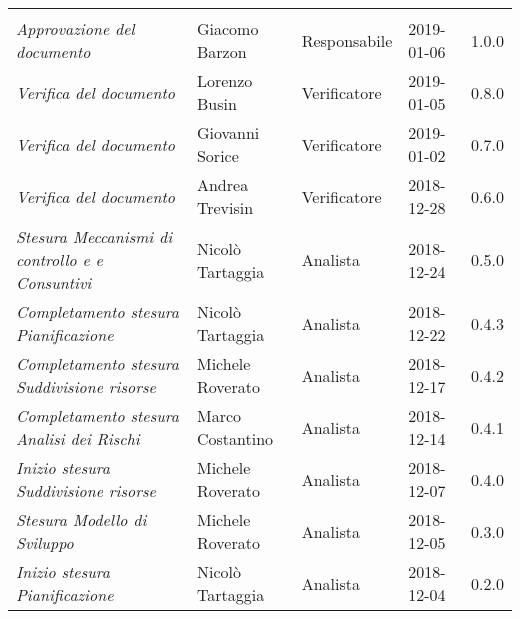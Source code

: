 \newpage 
\section*{}
\begin{table}[H]
	\centering
	\begin{tabular}{p{4cm}|C{3cm}|C{3cm}|R{2.5cm}|R{2cm}}
		
		 & & & & \\
		
		
		\emph{Approvazione del documento} & Giacomo Barzon & Responsabile & 2019-01-06 & 1.0.0 \\
		\hline
		
		\emph{Verifica del documento} & Lorenzo Busin & Verificatore & 2019-01-05 & 0.8.0 \\
		\hline
		
		\emph{Verifica del documento} & Giovanni Sorice & Verificatore & 2019-01-02 & 0.7.0 \\
		\hline
		
		\emph{Verifica del documento} & Andrea Trevisin & Verificatore & 2018-12-28 & 0.6.0 \\
		\hline
		
		\emph{Stesura Meccanismi di controllo e e Consuntivi} & Nicolò Tartaggia & Analista & 2018-12-24 & 0.5.0 \\
		\hline
		
		\emph{Completamento stesura Pianificazione} & Nicolò Tartaggia & Analista & 2018-12-22 & 0.4.3 \\
		\hline
		
		\emph{Completamento stesura Suddivisione risorse} & Michele Roverato & Analista & 2018-12-17 & 0.4.2 \\
		\hline
		
		\emph{Completamento stesura Analisi dei Rischi} & Marco Costantino & Analista & 2018-12-14 & 0.4.1 \\
		\hline
		
		\emph{Inizio stesura Suddivisione risorse} & Michele Roverato & Analista & 2018-12-07 & 0.4.0 \\
		\hline
		
		\emph{Stesura Modello di Sviluppo} & Michele Roverato & Analista & 2018-12-05 & 0.3.0 \\
		\hline
		
		\emph{Inizio stesura Pianificazione} & Nicolò Tartaggia & Analista & 2018-12-04 & 0.2.0 \\
		\hline
		

\end{tabular}
\end{table}
